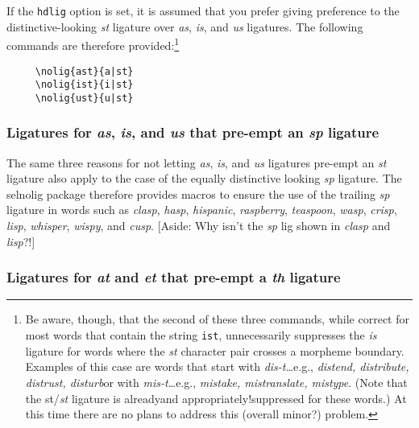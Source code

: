 \documentclass[12pt]{article}
\newcommand{\pkg}[1]{\textsf{#1}}
\newcommand{\opt}[1]{\texttt{#1}}
\begin{document}
If the \opt{hdlig} option is set, it is assumed that you prefer giving preference to the distinctive-looking \emph{st} ligature over \emph{as}, \emph{is}, and \emph{us} ligatures. The following commands are therefore provided:\footnote{Be aware, though, that the second of these three commands, while correct for most words that contain the string \opt{ist}, unnecessarily suppresses the \emph{is} ligature for words where the \emph{st} character pair crosses a morpheme boundary. Examples of this case are words that start with \emph{dis-t\ldots}\textemdash e.g., \emph{distend, distribute, distrust, disturb}\textemdash or with \emph{mis-t\ldots}\textemdash e.g., \emph{mistake, mistranslate, mistype}. (Note that the st/\emph{st} ligature is already\textemdash and appropriately!\textemdash suppressed for these words.) At this time there are no plans to address this (overall minor?) problem.}
\begin{Verbatim}
     \nolig{ast}{a|st}
     \nolig{ist}{i|st}
     \nolig{ust}{u|st}
\end{Verbatim}



\subsubsection{Ligatures for \emph{as}, \emph{is}, and \emph{us} that pre-empt an \emph{sp} ligature}

The same three reasons for not letting \emph{as}, \emph{is}, and \emph{us} ligatures pre-empt an \emph{st} ligature also apply to the case of the equally distinctive looking \emph{sp} ligature. The \pkg{selnolig} package therefore provides macros to ensure the use of the trailing \emph{sp} ligature in words such as \emph{clasp}, \emph{hasp}, \emph{hispanic}, \emph{raspberry}, \emph{teaspoon}, \emph{wasp}, \emph{crisp}, \emph{lisp}, \emph{whisper}, \emph{wispy}, and \emph{cusp}. 
[Aside: Why isn't the \emph{sp} lig shown in \emph{clasp} and \emph{lisp}?!]



\subsubsection{Ligatures for \emph{at} and \emph{et} that pre-empt a \emph{th} ligature}
\end{document}
